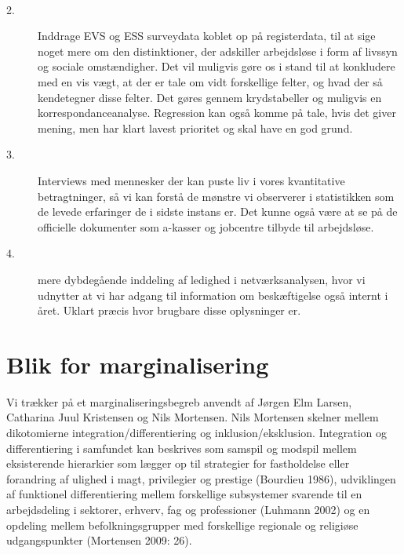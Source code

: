 \begin{description}
%
\ 
  \item[2.] Inddrage EVS og ESS surveydata koblet op på registerdata, til at sige noget mere om den distinktioner, der adskiller arbejdsløse i form af livssyn og sociale omstændigher. Det vil muligvis gøre os i stand til at konkludere med en vis vægt, at der er tale om vidt forskellige felter, og hvad der så kendetegner disse felter. Det gøres gennem krydstabeller og muligvis en korrespondanceanalyse. Regression kan også komme på tale, hvis det giver mening, men har klart lavest prioritet og skal have en god grund.
  \item[3.] Interviews med mennesker der kan puste liv i vores kvantitative betragtninger, så vi kan forstå de mønstre vi observerer i statistikken som de levede erfaringer de i sidste instans er. Det kunne også være at se på de officielle dokumenter som a-kasser og jobcentre tilbyde til arbejdsløse.
  \item[4.] mere dybdegående inddeling af ledighed i netværksanalysen, hvor vi udnytter at vi har adgang til information om beskæftigelse også internt i året. Uklart præcis hvor brugbare disse oplysninger er.
\end{description}
%

\section{Blik for marginalisering \label{}}

Vi trækker på et marginaliseringsbegreb anvendt af Jørgen Elm Larsen, Catharina Juul Kristensen og Nils Mortensen. Nils Mortensen skelner mellem dikotomierne integration/differentiering og inklusion/eksklusion. Integration og differentiering i samfundet kan beskrives som samspil og modspil mellem eksisterende hierarkier som lægger op til strategier for fastholdelse eller forandring af ulighed i magt, privilegier og prestige (Bourdieu 1986), udviklingen af funktionel differentiering mellem forskellige subsystemer svarende til en arbejdsdeling i sektorer, erhverv, fag og professioner (Luhmann 2002) og en opdeling mellem befolkningsgrupper med forskellige regionale og religiøse udgangspunkter (Mortensen 2009: 26).

